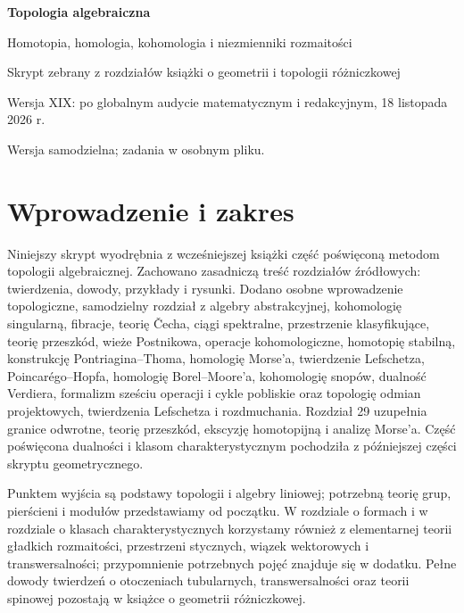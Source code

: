 \documentclass[11pt,a4paper,oneside]{report}
\theoremstyle{plain}
\theoremstyle{definition}
\theoremstyle{remark}
\begin{document}
\hypersetup{pageanchor=false}
\begin{titlepage}
\centering
\vspace*{4cm}
{\Huge\bfseries Topologia algebraiczna\par}
\vspace{0.6cm}
{\Large Homotopia, homologia, kohomologia i niezmienniki rozmaitości\par}
\vspace{1.3cm}
{\large Skrypt zebrany z rozdziałów książki o geometrii i topologii różniczkowej\par}
\vspace{1.0cm}
{\large Wersja XIX: po globalnym audycie matematycznym i redakcyjnym, 18 listopada 2026 r.\par}
\vfill
{\normalsize Wersja samodzielna; zadania w osobnym pliku.\par}
\end{titlepage}
\hypersetup{pageanchor=true}
\begingroup
\footnotesize\linespread{0.92}\selectfont\setlength{\parskip}{0pt}
\tableofcontents
\endgroup
\clearpage
\chapter*{Wprowadzenie i zakres}
Niniejszy skrypt wyodrębnia z wcześniejszej książki część poświęconą
metodom topologii algebraicznej. Zachowano zasadniczą treść rozdziałów
źródłowych: twierdzenia, dowody, przykłady i rysunki.
Dodano osobne wprowadzenie topologiczne, samodzielny rozdział
z algebry abstrakcyjnej, kohomologię singularną,
fibracje, teorię \v{C}echa, ciągi spektralne, przestrzenie klasyfikujące, teorię przeszkód, wieże Postnikowa, operacje kohomologiczne, homotopię stabilną, konstrukcję Pontriagina--Thoma, homologię Morse'a, twierdzenie Lefschetza, Poincarégo--Hopfa, homologię Borel--Moore'a, kohomologię snopów, dualność Verdiera, formalizm sześciu operacji i cykle pobliskie oraz topologię odmian projektowych, twierdzenia Lefschetza i rozdmuchania. Rozdział 29 uzupełnia granice odwrotne, teorię przeszkód, ekscyzję homotopijną i analizę Morse'a.
Część poświęcona dualności i klasom charakterystycznym pochodziła z
późniejszej części skryptu geometrycznego.

Punktem wyjścia są podstawy topologii i algebry liniowej;
potrzebną teorię grup, pierścieni i modułów przedstawiamy od początku.
W rozdziale o formach i w rozdziale o klasach charakterystycznych
korzystamy również z elementarnej teorii gładkich rozmaitości,
przestrzeni stycznych, wiązek wektorowych i transwersalności;
przypomnienie potrzebnych pojęć znajduje się w dodatku.
Pełne dowody twierdzeń o otoczeniach tubularnych, transwersalności
oraz teorii spinowej pozostają w książce o geometrii różniczkowej.
\end{document}
